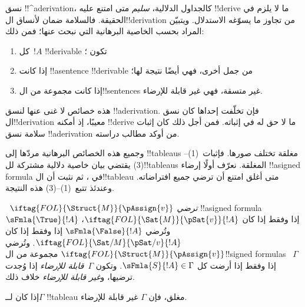 \documentclass[../../../include/open-logic-section]{subfiles}
\begin{document}
      {}
      {}
      

\begin{explain}
نسق !!^a{derivation}، كالجداول الدلالية، \emph{سليم} متى امتنع عليه
!!{derive} ما لا يلزم في الحقيقة. فالسلامة ضمان لأنساق ال!!{derivation}
من تجاوز ما يسوّغه الاستدلال. ويتبيّن المراد بحسب الخاصية البرهانية
التي نبحث عنها؛ فمن ذلك:
\begin{enumerate}
\item كل~$!A$ !!{derivable} تكون ؛
\item إذا كانت !!a{sentence} !!{derivable} من جمل أخرى، فهي أيضًا نتيجة لها؛
\item إذا كانت مجموعة من ال!!{sentence}s غير متسقة، فهي غير قابلة للإرضاء.
\end{enumerate}
هذه خصائص لا غنى عنها لنسق !!a{derivation}. فإن تخلّفت إحداها
كان نسق ال!!{derivation} معيبًا، إذ أمكنه !!{derive} ما لا حق له
في إثباته. فمن أجل ذلك كان إثبات سلامة نسق !!a{derivation}
من أوكد مطالب دراسته.

وجميع هذه الخصائص البرهانية مردّها إلى !!{tableau}s مغلقة
تختلف صورها. فإثبات~(1)--(3) يقتضي بيان خاصية دلالية مشتركة
لل!!{tableau}s المغلقة. نعرّف أولًا إرضاء
!!a{signed formula} في ، ثم نثبت أن
ال!!{tableau} متى أغلق امتنع أن ترضي 
جميع افتراضاته. وعندئذ تتبع~(1)--(3) هذه النتيجة.
\end{explain}

\begin{defn}
~$\iftag{FOL}{\Struct{M}}{\pAssign{v}}$
\emph{ترضي}
!!a{signed formula} $\sFmla{\True}{!A}$ إذا وفقط إذا كان
$\iftag{FOL}{\Sat{M}}{\pSat{v}}{!A}$، وتُرضي
$\sFmla{\False}{!A}$ إذا وفقط إذا كان
$\iftag{FOL}{\Sat/{M}}{\pSat/{v}}{!A}$. وتُرضي
$\iftag{FOL}{\Struct{M}}{\pAssign{v}}$ مجموعة من ال!!{signed formula}s
~$\Gamma$ إذا وفقط إذا أرضت كل $\sFmla{S}{!A} \in \Gamma$. وتكون
$\Gamma$~\emph{قابلة للإرضاء} إذا وُجدت
 ترضيها، و\emph{غير قابلة
للإرضاء} خلاف ذلك.
\end{defn}

\begin{thm}[السلامة]
  إذا كان لــ$\Gamma$ !!{tableau} مغلق، فإن $\Gamma$ غير قابلة للإرضاء.
\end{thm}
\end{document}

